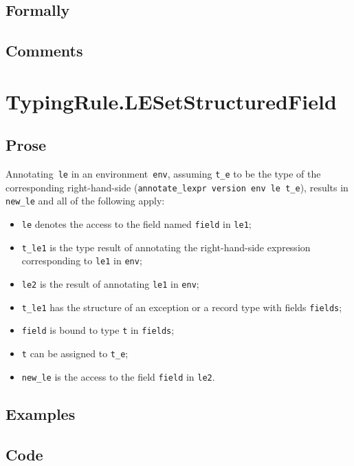 \documentclass{book}
\begin{document}
  \subsection{Formally}

  \subsection{Comments}

\section{TypingRule.LESetStructuredField \label{sec:TypingRule.LESetStructuredField}}

    \subsection{Prose}
   Annotating~\texttt{le} in an environment~\texttt{env}, assuming
\texttt{t\_e} to be the type of the corresponding right-hand-side
(\texttt{annotate\_lexpr version env le t\_e}), results in \texttt{new\_le} and
all of the following apply:
   \begin{itemize}
   \item \texttt{le} denotes the access to the field named \texttt{field} in \texttt{le1};
   \item \texttt{t\_le1} is the type result of annotating the right-hand-side expression corresponding to \texttt{le1} in \texttt{env};
   \item \texttt{le2} is the result of annotating \texttt{le1} in \texttt{env};
   \item \texttt{t\_le1} has the structure of an exception or a record type with fields \texttt{fields};
   \item \texttt{field} is bound to type \texttt{t} in \texttt{fields};
   \item \texttt{t} can be assigned to \texttt{t\_e}; 
   \item \texttt{new\_le} is the access to the field \texttt{field} in \texttt{le2}.
   \end{itemize}

  \subsection{Examples}

  \subsection{Code}
\end{document}
